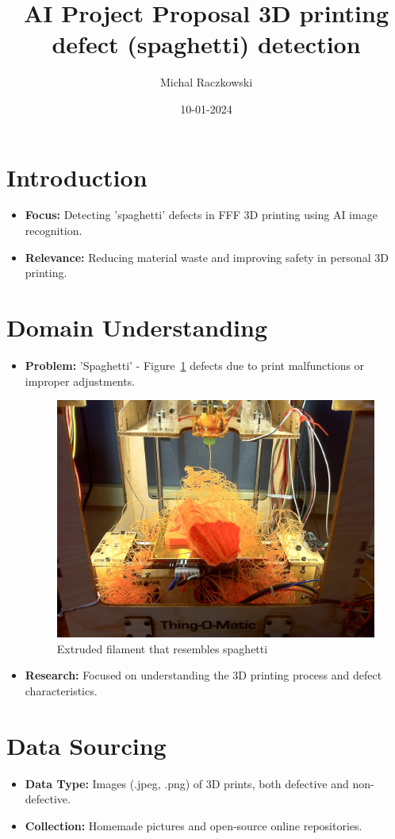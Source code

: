 \documentclass[12pt,a4paper]{article}
\title{\textbf{AI Project Proposal 3D printing defect (spaghetti) detection }}
\author{Michal Raczkowski}
\date{10-01-2024}
\begin{document}
\maketitle
\thispagestyle{empty} %

\newpage
\tableofcontents
\newpage

\setcounter{page}{1} %

\section{Introduction}
\begin{itemize}
    \item \textbf{Focus:} Detecting 'spaghetti' defects in FFF 3D printing using AI image recognition.
    \item \textbf{Relevance:} Reducing material waste and improving safety in personal 3D printing.
\end{itemize}

\section{Domain Understanding}
\begin{itemize}
    \item \textbf{Problem:} 'Spaghetti' - Figure~\ref{fig:spaghetti3D} defects due to print malfunctions or improper adjustments.
    \begin{figure}[h]
    \centering
    \includegraphics[width=0.5\linewidth]{spaghetti3D.jpg}
    \caption{Extruded filament that resembles spaghetti}
    \label{fig:spaghetti3D}
    \end{figure}

    \item \textbf{Research:} Focused on understanding the 3D printing process and defect characteristics.
\end{itemize}

\section{Data Sourcing}
\begin{itemize}
    \item \textbf{Data Type:} Images (.jpeg, .png) of 3D prints, both defective and non-defective.
    \item \textbf{Collection:} Homemade pictures and open-source online repositories.
\end{itemize}
\end{document}
